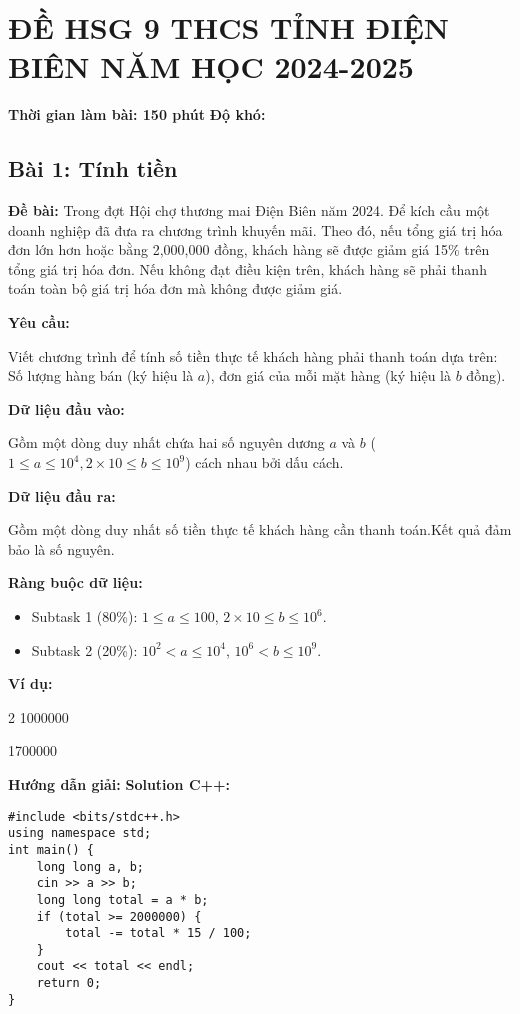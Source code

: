 \documentclass[12pt]{scrartcl}  %
\begin{document}
\section{ĐỀ HSG 9 THCS TỈNH ĐIỆN BIÊN NĂM HỌC 2024-2025}
\textbf{Thời gian làm bài: 150 phút}
\textbf{Độ khó: }
\subsection{Bài 1: Tính tiền}
\textbf{Đề bài:}
Trong đợt Hội chợ thương mai Điện Biên năm 2024. Để kích cầu một doanh nghiệp đã đưa ra chương trình khuyến mãi. Theo đó, nếu tổng giá trị hóa đơn lớn hơn hoặc bằng 2,000,000 đồng, khách hàng sẽ được giảm giá 15\% trên tổng giá trị hóa đơn. Nếu không đạt điều kiện trên, khách hàng sẽ phải thanh toán toàn bộ giá trị hóa đơn mà không được giảm giá.

\textbf{Yêu cầu:}

Viết chương trình để tính số tiền thực tế khách hàng phải thanh toán dựa trên: Số lượng hàng bán (ký hiệu là $a$), đơn giá của mỗi mặt hàng (ký hiệu là $b$ đồng).

\textbf{Dữ liệu đầu vào:}

Gồm một dòng duy nhất chứa hai số nguyên dương $a$ và $b$ ($1 \leq a \leq 10^4,2 \times 10 \leq b \leq 10^9$) cách nhau bởi dấu cách.

\textbf{Dữ liệu đầu ra:}

Gồm một dòng duy nhất số tiền thực tế khách hàng cần thanh toán.Kết quả đảm bảo là số nguyên.

\textbf{Ràng buộc dữ liệu:}
\begin{itemize}
    \item Subtask 1 (80\%): $1 \leq a \leq 100$, $2 \times 10 \leq b \leq 10^6$.
    \item Subtask 2 (20\%): $10^2 < a \leq 10^4$, $10^6 < b \leq 10^9$.
\end{itemize}

\textbf{Ví dụ:}
\begin{tcolorbox}[colback=gray!5!white, colframe=blue!50!black, title=Input]
2 1000000
\end{tcolorbox}
\begin{tcolorbox}[colback=gray!5!white, colframe=green!50!black, title=Output]
1700000
\end{tcolorbox}
\textbf{Hướng dẫn giải:}
\textbf{Solution C++:}
\begin{lstlisting}
#include <bits/stdc++.h>
using namespace std;
int main() {
    long long a, b;
    cin >> a >> b;
    long long total = a * b;
    if (total >= 2000000) {
        total -= total * 15 / 100; 
    }
    cout << total << endl;
    return 0;
}
\end{lstlisting}
\end{document}

